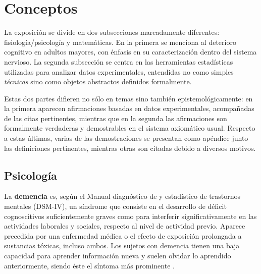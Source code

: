 
\section{Conceptos}

La exposición se divide en dos subsecciones marcadamente diferentes: fisiología/psicología y 
matemáticas.
En la primera se menciona al deterioro cognitivo en adultos mayores, con énfasis en su 
caracterización dentro del sistema nervioso.
La segunda subsección se centra en las herramientas estadísticas utilizadas para analizar datos 
experimentales, entendidas no como simples \textit{técnicas} sino como objetos abstractos
definidos formalmente.

Estas dos partes difieren no sólo en temas sino también epistemológicamente: en la
primera aparecen afirmaciones basadas en datos experimentales, acompañadas de las citas 
pertinentes, mientras que en la segunda las
afirmaciones son formalmente verdaderas y demostrables en el sistema 
axiomático usual. Respecto a estas últimas, varias de las demostraciones se presentan como 
apéndice junto las definiciones pertinentes, mientras otras son citadas debido a diversos motivos.

\subsection{Psicología}


La \textbf{demencia} es, según el Manual diagnóstico de y estadístico de trastornos mentales
(DSM-IV), un síndrome que consiste en el desarrollo de déficit cognoscitivos
suficientemente graves como para interferir significativamente en las actividades laborales 
y sociales, respecto al nivel de actividad previo. Aparece precedida por una enfermedad médica o
el efecto de exposición prolongada a sustancias tóxicas, incluso ambos.
Los sujetos con demencia tienen una baja capacidad para aprender información nueva y 
suelen olvidar lo aprendido anteriormente, siendo éste el síntoma más prominente \cite{DCM_5}.


